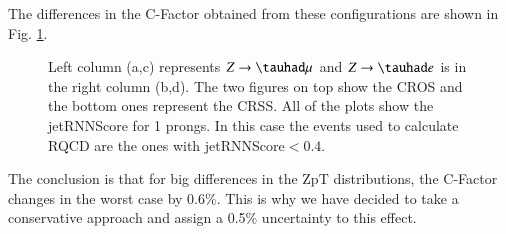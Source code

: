 The differences in the C-Factor obtained from these configurations are shown in Fig. \ref{Fig15}. 
\begin{figure}[htbp]
	\centering
	\caption{Left column (a,c) represents $Z\to\tauhad\mu$ and $Z\to\tauhad e$ is in the right column (b,d). The two figures on top show the CROS and the bottom ones represent the CRSS. All of the plots show the jetRNNScore for 1 prongs. In this case the events used to calculate RQCD are the ones with jetRNNScore$<0.4$.  }
	\label{Fig15}
\end{figure}

The conclusion is that for big differences in the ZpT distributions, the C-Factor changes in the worst case by 0.6$\%$. This is why we have decided to take a conservative approach and assign a 0.5$\%$ uncertainty to this effect.

